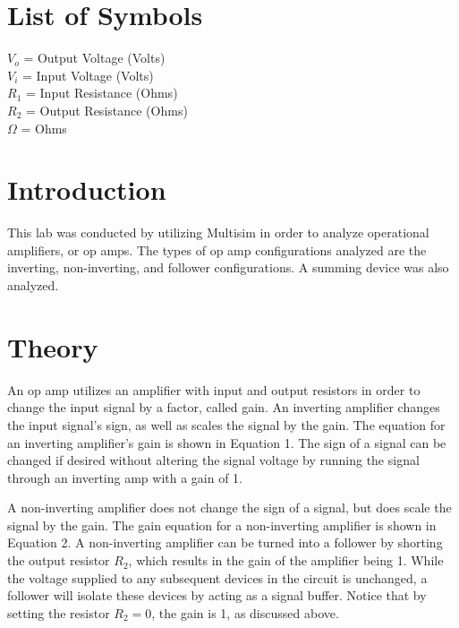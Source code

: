 \documentclass[12pt]{article}
\begin{document}
\section*{\fontsize{12}{12}\selectfont \large List of Symbols}
$V_{o}$ = Output Voltage (Volts)\\
$V_{i}$ = Input Voltage (Volts)\\
$R_{1}$ = Input Resistance (Ohms)\\
$R_{2}$ = Output Resistance (Ohms)\\
$\Omega$ = Ohms

\newpage



\section*{\fontsize{12}{12}\selectfont \large Introduction}
This lab was conducted by utilizing Multisim in order to analyze operational amplifiers, or op amps. The types of op amp configurations analyzed are the inverting, non-inverting, and follower configurations. A summing device was also analyzed.



\section*{\fontsize{12}{12}\selectfont \large Theory}
An op amp utilizes an amplifier with input and output resistors in order to change the input signal by a factor, called gain. An inverting amplifier changes the input signal's sign, as well as scales the signal by the gain. The equation for an inverting amplifier's gain is shown in Equation 1. The sign of a signal can be changed if desired without altering the signal voltage by running the signal through an inverting amp with a gain of 1.
\bigskip

A non-inverting amplifier does not change the sign of a signal, but does scale the signal by the gain. The gain equation for a non-inverting amplifier is shown in Equation 2. A non-inverting amplifier can be turned into a follower by shorting the output resistor $R_{2}$, which results in the gain of the amplifier being 1. While the voltage supplied to any subsequent devices in the circuit is unchanged, a follower will isolate these devices by acting as a signal buffer. Notice that by setting the resistor $R_{2} = 0$, the gain is 1, as discussed above.
\bigskip
\end{document}
